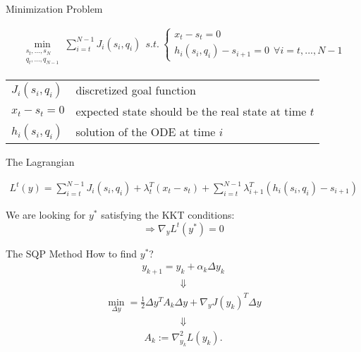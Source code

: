 \begin{frame}{Minimization Problem}
\begin{block}{}
\small{
\begin{align*}
  \min_{\begin{array}{c} s_{t},...,s_{N}\\ q_{t},...,q_{N-1} \end{array}} \sum_{i=t}^{N-1} J_{i}(s_{i},q_{i}) \ \  
  s.t. \ \left\lbrace \begin{array}{c}
  x_{t} - s_{t} = 0 \\
  h_i (s_i ,q_i ) - s_{i+1} = 0 \ \ \forall i = t, ... , N-1 \end{array} \right. 
\end{align*}}
\end{block}
\vspace{1ex}
\begin{tabular}{l l}
  $J_i(s_i, q_i)$ &  discretized goal function 
  \vspace{1ex} \\
$x_t - s_t = 0$ & expected state should be the real state at time $t$
  \vspace{1ex} \\
$h_i (s_i ,q_i )$ & solution of the ODE at time $i$ \\
\end{tabular}
\end{frame}

\begin{frame}{The Lagrangian}
\begin{block}{ }
\begin{align*}
  L^{t}(y) = \sum_{i=t}^{N-1} J_{i}(s_{i},q_{i})
  + \lambda_{t}^{T}(x_{t} - s_{t})
  + \sum_{i=t}^{N-1} \lambda_{i+1}^{T} (h_i (s_i ,q_i ) - s_{i+1}) 
\end{align*}
\vspace{.1ex}
\end{block}
\vspace{1ex}
We are looking for $y^*$ satisfying the KKT conditions: \\

\[ \Rightarrow \nabla_{y} L^{t}(y^*)  = 0 \]

\end{frame}

\begin{frame}{The SQP Method}
How to find $y^*$?
\begin{align*}
  y_{k+1} = y_{k} + \alpha_{k} \Delta y_{k}
\end{align*}
\onslide<2->
\begin{align*}
\Downarrow
\end{align*}
\begin{align*}
\min_{\Delta y} = \frac{1}{2} \Delta y^T A_k \Delta y + \nabla_y J(y_k)^T \Delta y
\end{align*}
\onslide<3->
\begin{align*}
\Downarrow
\end{align*}
\begin{align*}
A_{k} := \nabla^{2}_{y_k} L(y_k).
\end{align*}
  
\end{frame}


